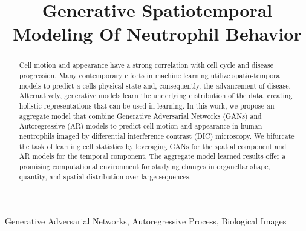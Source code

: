 \documentclass{article}
\title{Generative Spatiotemporal Modeling Of Neutrophil Behavior}
\newcommand{\squeezeup}{\vspace{-2.5mm}}
\begin{document}
%
\maketitle
%
\begin{abstract}
\small{
Cell motion and appearance have a strong correlation with cell cycle and disease progression. Many contemporary efforts in machine learning utilize spatio-temporal models to predict a cell\textquotesingle s physical state and, consequently, the advancement of disease. Alternatively, generative models learn the underlying distribution of the data, creating holistic representations that can be used in learning. In this work, we propose an aggregate model that combine Generative Adversarial Networks (GANs) and Autoregressive (AR) models to predict cell motion and appearance in human neutrophils imaged by differential interference contrast (DIC) microscopy. We bifurcate the task of learning cell statistics by leveraging GANs for the spatial component and AR models for the temporal component. The aggregate model learned results offer a promising computational environment for studying changes in organellar shape, quantity, and spatial distribution over large sequences.
}
\end{abstract}
\vspace{-0.2cm}
\begin{keywords}
\small{
Generative Adversarial Networks, Autoregressive Process, Biological Images
}
\end{keywords}
\vspace{-5pt}
\setlength{\parskip}{0em}
\squeezeup
\end{document}
